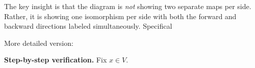 \documentclass[12pt]{article}
\theoremstyle{remark}
\theoremstyle{definition}
\begin{document}
\noindent The key insight is that the diagram is \emph{not} showing two
separate maps per side. Rather, it is showing one isomorphism per side
with both the forward and backward directions labeled simultaneously.
Specifical

More detailed version:\\
\begin{center}
\end{center}

\medskip
\noindent\textbf{Step-by-step verification.}
Fix $x \in V$.
\end{document}

